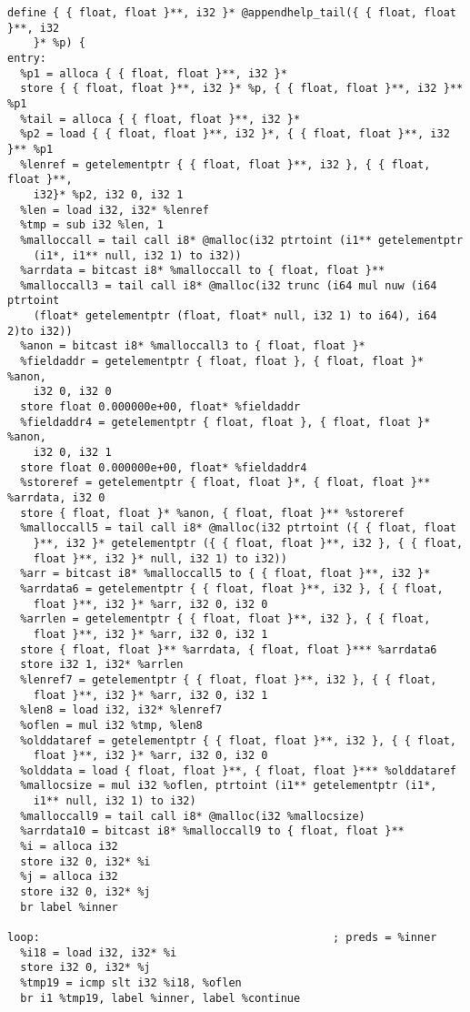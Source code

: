 \documentclass[main.tex]{subfiles}
\begin{document}
{\begin{lstlisting}
define { { float, float }**, i32 }* @appendhelp_tail({ { float, float }**, i32
    }* %p) {
entry:
  %p1 = alloca { { float, float }**, i32 }*
  store { { float, float }**, i32 }* %p, { { float, float }**, i32 }** %p1
  %tail = alloca { { float, float }**, i32 }*
  %p2 = load { { float, float }**, i32 }*, { { float, float }**, i32 }** %p1
  %lenref = getelementptr { { float, float }**, i32 }, { { float, float }**, 
    i32}* %p2, i32 0, i32 1
  %len = load i32, i32* %lenref
  %tmp = sub i32 %len, 1
  %malloccall = tail call i8* @malloc(i32 ptrtoint (i1** getelementptr
    (i1*, i1** null, i32 1) to i32))
  %arrdata = bitcast i8* %malloccall to { float, float }**
  %malloccall3 = tail call i8* @malloc(i32 trunc (i64 mul nuw (i64 ptrtoint
    (float* getelementptr (float, float* null, i32 1) to i64), i64 2)to i32))
  %anon = bitcast i8* %malloccall3 to { float, float }*
  %fieldaddr = getelementptr { float, float }, { float, float }* %anon,
    i32 0, i32 0
  store float 0.000000e+00, float* %fieldaddr
  %fieldaddr4 = getelementptr { float, float }, { float, float }* %anon,
    i32 0, i32 1
  store float 0.000000e+00, float* %fieldaddr4
  %storeref = getelementptr { float, float }*, { float, float }** %arrdata, i32 0
  store { float, float }* %anon, { float, float }** %storeref
  %malloccall5 = tail call i8* @malloc(i32 ptrtoint ({ { float, float 
    }**, i32 }* getelementptr ({ { float, float }**, i32 }, { { float, 
    float }**, i32 }* null, i32 1) to i32))
  %arr = bitcast i8* %malloccall5 to { { float, float }**, i32 }*
  %arrdata6 = getelementptr { { float, float }**, i32 }, { { float, 
    float }**, i32 }* %arr, i32 0, i32 0
  %arrlen = getelementptr { { float, float }**, i32 }, { { float, 
    float }**, i32 }* %arr, i32 0, i32 1
  store { float, float }** %arrdata, { float, float }*** %arrdata6
  store i32 1, i32* %arrlen
  %lenref7 = getelementptr { { float, float }**, i32 }, { { float, 
    float }**, i32 }* %arr, i32 0, i32 1
  %len8 = load i32, i32* %lenref7
  %oflen = mul i32 %tmp, %len8
  %olddataref = getelementptr { { float, float }**, i32 }, { { float, 
    float }**, i32 }* %arr, i32 0, i32 0
  %olddata = load { float, float }**, { float, float }*** %olddataref
  %mallocsize = mul i32 %oflen, ptrtoint (i1** getelementptr (i1*, 
    i1** null, i32 1) to i32)
  %malloccall9 = tail call i8* @malloc(i32 %mallocsize)
  %arrdata10 = bitcast i8* %malloccall9 to { float, float }**
  %i = alloca i32
  store i32 0, i32* %i
  %j = alloca i32
  store i32 0, i32* %j
  br label %inner

loop:                                             ; preds = %inner
  %i18 = load i32, i32* %i
  store i32 0, i32* %j
  %tmp19 = icmp slt i32 %i18, %oflen
  br i1 %tmp19, label %inner, label %continue


\end{lstlisting}}
\end{document}

